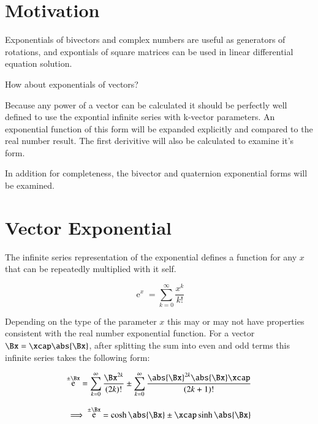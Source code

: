 \documentclass{article}      %
\title{} %
\author{Peeter Joot \quad peeter.joot@gmail.com}         %
\DeclareMathOperator{\Exp}{e}
\begin{document}

\maketitle{}

\section{ Motivation }

Exponentials of bivectors and complex numbers are useful as generators of rotations, and expontials of
square matrices can be used in linear differential equation solution.

How about exponentials of vectors?

Because any power of a vector can be calculated it should be perfectly well defined to use the expontial infinite series with k-vector parameters.  An 
exponential function of this form will be expanded explicitly and compared to the real number result.  The first
derivitive will also be calculated to examine it's form.

In addition for completeness, the bivector and quaternion exponential forms will be examined.

\section{ Vector Exponential }

The infinite series representation of the exponential defines a function for any $x$ that can be repeatedly multiplied
with it self.

\begin{equation}
\Exp^x = \sum_{k=0}^{\infty} \frac{x^k}{k!}
\end{equation}

Depending on the type of the parameter $x$ this may or may not have properties consistent with
the real number exponential function.
For a vector $\Bx = \xcap\abs{\Bx}$, after splitting the sum into even and odd terms this infinite series takes the
following form:

\begin{equation*}
\Exp^{\pm\Bx}
= 
\sum_{k=0}^{\infty} \frac{\Bx^{2k}}{(2k)!}
\pm
\sum_{k=0}^{\infty} \frac{\abs{\Bx}^{2k}\abs{\Bx}\xcap}{(2k+1)!} 
\end{equation*}

\begin{equation}
\implies
\Exp^{\pm\Bx}
= 
\cosh\abs{\Bx}
\pm
\xcap \sinh\abs{\Bx}
\end{equation}
\end{document}
